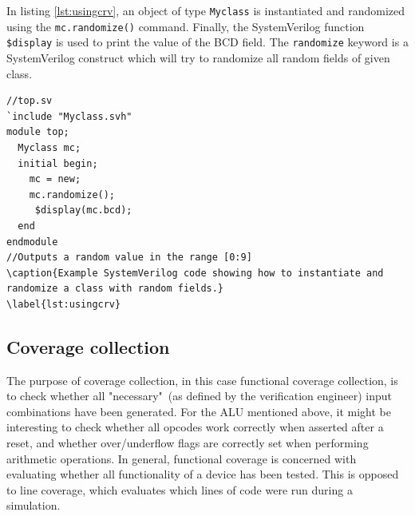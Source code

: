 \documentclass[conference]{IEEEtran}
\newcommand{\SV}{SystemVerilog\xspace}
\newcommand{\longlist}[3]{{}}
\begin{document}
\longlist{snippets/Myclass.svh}{Example SystemVerilog code showing how different values are constrained.}{lst:crvlst}


In listing \ref{lst:usingcrv}, an object of type \texttt{Myclass} is instantiated and randomized using the \texttt{mc.randomize()} command. Finally, the \SV function \texttt{\$display} is used to print the value of the BCD field. The \texttt{randomize} keyword is a \SV construct which will try to randomize all random fields of given class.

\begin{lstlisting}
//top.sv
`include "Myclass.svh"
module top;
  Myclass mc;
  initial begin;
    mc = new;
    mc.randomize();
	 $display(mc.bcd);
  end
endmodule
//Outputs a random value in the range [0:9]
\caption{Example SystemVerilog code showing how to instantiate and randomize a class with random fields.}
\label{lst:usingcrv}
\end{lstlisting}

\subsection{Coverage collection}
The purpose of coverage collection, in this case functional coverage collection, is to check whether all "necessary"\, (as defined by the verification engineer) input combinations have been generated. For the ALU mentioned above, it might be interesting to check whether all opcodes work correctly when asserted after a reset, and whether over/underflow flags are correctly set when performing arithmetic operations. In general, functional coverage is concerned with evaluating whether all functionality of a device has been tested. This is opposed to line coverage, which evaluates which lines of code were run during a simulation.

\longlist{snippets/Cover.svh}{Examle SystemVerilog code showing how covergrups and coverpoints are organized.}{lst:cov}

\end{document}
